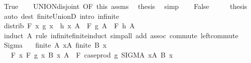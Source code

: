 \begin{isabellebody}
\ True\isanewline
\ \ \isamarkupfalse%
\ UNION{\isacharunderscore}{\kern0pt}disjoint\ {\isacharbrackleft}{\kern0pt}OF\ this\ assms{\isacharbrackright}{\kern0pt}\ \isamarkupfalse%
\ {\isacharquery}{\kern0pt}thesis\ \isamarkupfalse%
\ simp\isanewline
{}\isamarkupfalse%
\isanewline
\ \ \isamarkupfalse%
\ False\isanewline
\ \ \isamarkupfalse%
\ \isamarkupfalse%
\ {\isacharquery}{\kern0pt}thesis\ \isamarkupfalse%
\ {\isacharparenleft}{\kern0pt}auto\ dest{\isacharcolon}{\kern0pt}\ finite{\isacharunderscore}{\kern0pt}UnionD\ intro{\isacharcolon}{\kern0pt}\ infinite{\isacharparenright}{\kern0pt}\isanewline
{}\isamarkupfalse%
%
\endisatagproof
{\isafoldproof}%
%
\isadelimproof
\isanewline
%
\endisadelimproof
\isanewline
{}\isamarkupfalse%
\ distrib{\isacharcolon}{\kern0pt}\ {\isachardoublequoteopen}F\ {\isacharparenleft}{\kern0pt}{\isasymlambda}x{\isachardot}{\kern0pt}\ g\ x\ \isactrlbold {\isacharasterisk}{\kern0pt}\ h\ x{\isacharparenright}{\kern0pt}\ A\ {\isacharequal}{\kern0pt}\ F\ g\ A\ \isactrlbold {\isacharasterisk}{\kern0pt}\ F\ h\ A{\isachardoublequoteclose}\isanewline
%
\isadelimproof
\ \ %
\endisadelimproof
%
\isatagproof
{}\isamarkupfalse%
\ {\isacharparenleft}{\kern0pt}induct\ A\ rule{\isacharcolon}{\kern0pt}\ infinite{\isacharunderscore}{\kern0pt}finite{\isacharunderscore}{\kern0pt}induct{\isacharparenright}{\kern0pt}\ {\isacharparenleft}{\kern0pt}simp{\isacharunderscore}{\kern0pt}all\ add{\isacharcolon}{\kern0pt}\ assoc\ commute\ left{\isacharunderscore}{\kern0pt}commute{\isacharparenright}{\kern0pt}%
\endisatagproof
{\isafoldproof}%
%
\isadelimproof
\isanewline
%
\endisadelimproof
\isanewline
{}\isamarkupfalse%
\ Sigma{\isacharcolon}{\kern0pt}\isanewline
\ \ \ {\isachardoublequoteopen}finite\ A{\isachardoublequoteclose}\ {\isachardoublequoteopen}{\isasymforall}x{\isasymin}A{\isachardot}{\kern0pt}\ finite\ {\isacharparenleft}{\kern0pt}B\ x{\isacharparenright}{\kern0pt}{\isachardoublequoteclose}\isanewline
\ \ \ {\isachardoublequoteopen}F\ {\isacharparenleft}{\kern0pt}{\isasymlambda}x{\isachardot}{\kern0pt}\ F\ {\isacharparenleft}{\kern0pt}g\ x{\isacharparenright}{\kern0pt}\ {\isacharparenleft}{\kern0pt}B\ x{\isacharparenright}{\kern0pt}{\isacharparenright}{\kern0pt}\ A\ {\isacharequal}{\kern0pt}\ F\ {\isacharparenleft}{\kern0pt}case{\isacharunderscore}{\kern0pt}prod\ g{\isacharparenright}{\kern0pt}\ {\isacharparenleft}{\kern0pt}SIGMA\ x{\isacharcolon}{\kern0pt}A{\isachardot}{\kern0pt}\ B\ x{\isacharparenright}{\kern0pt}{\isachardoublequoteclose}\isanewline

\end{isabellebody}
